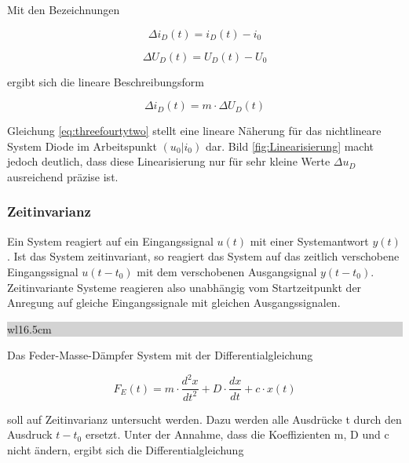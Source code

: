 \noindent Mit den Bezeichnungen

\begin{equation}\label{eq:threefourty}
\Delta i_{D}(t)=i_{D}(t)-i_{0}
\end{equation}

\begin{equation}\label{eq:threefourtyone}
\Delta U_{D}(t)=U_{D}(t)-U_{0}
\end{equation}

\noindent ergibt sich die lineare Beschreibungsform

\begin{equation}\label{eq:threefourtytwo}
\Delta i_{D}(t)=m\cdot \Delta U_{D}(t)
\end{equation}

\noindent Gleichung \ref{eq:threefourtytwo} stellt eine lineare Näherung für das nichtlineare System Diode im Arbeitspunkt $(u_{0}|i_{0})$ dar. Bild \ref{fig:Linearisierung} macht jedoch deutlich, dass diese Linearisierung nur für sehr kleine Werte $\Delta u_{D}$ ausreichend präzise ist.

\subsubsection{Zeitinvarianz}\label{threetwotwo}
Ein System reagiert auf ein Eingangssignal $u(t)$ mit einer Systemantwort $y(t)$. Ist das System zeitinvariant, so reagiert das System auf das zeitlich verschobene  Eingangssignal $u(t-t_{0})$ mit dem verschobenen Ausgangsignal $y(t-t_{0})$. Zeitinvariante Systeme reagieren also unabhängig vom Startzeitpunkt der Anregung auf gleiche Eingangssignale mit gleichen Ausgangssignalen.\bigskip

\noindent
\colorbox{lightgray}{%
%
\renewcommand\arraystretch{0.6}%
\begin{tabular}{ wl{16.5cm} }
{\selectfont{Beispiel: Zeitinvarianz eines Feder-Masse-Dämpfer Systems }}
\end{tabular}%
}\bigskip

\noindent Das Feder-Masse-Dämpfer System mit der Differentialgleichung

\begin{equation}\label{eq:threefourtythree}
F_{E}(t)= m\cdot \frac{d^2x}{dt^2}+D\cdot \frac{dx}{dt} + c\cdot x(t)
\end{equation}

\noindent soll auf Zeitinvarianz untersucht werden. Dazu werden alle Ausdrücke t durch den Ausdruck $t - t_{0}$ ersetzt. Unter der Annahme, dass die Koeffizienten m, D und c nicht ändern, ergibt sich die Differentialgleichung

